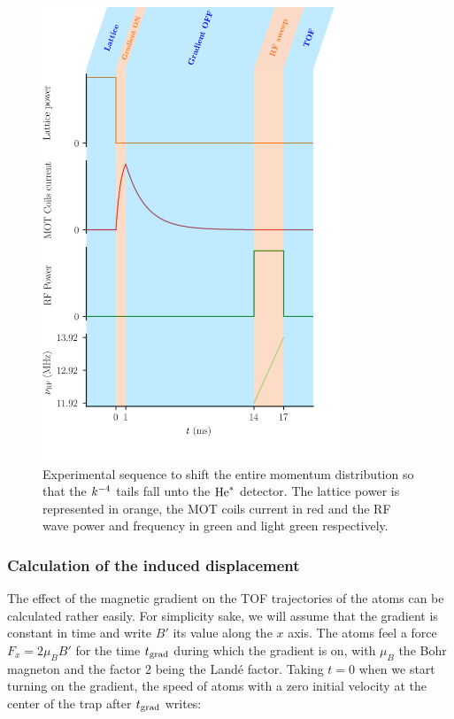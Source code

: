 \begin{figure}
    \centering
    \includegraphics[width=0.8\textwidth]{Fig/Chapter5/displacement_sequence.png}
    \caption[Experimental sequence to shift the entire momentum distribution so that the $\kmf$ tails fall unto the $\He$ detector]{Experimental sequence to shift the entire momentum distribution so that the $\kmf$ tails fall unto the $\He$ detector. The lattice power is represented in orange, the MOT coils current in red and the RF wave power and frequency in green and light green respectively.}
    \label{fig:displacement_sequence}
\end{figure}

\subsubsection{Calculation of the induced displacement}

The effect of the magnetic gradient on the TOF trajectories of the atoms can be calculated rather easily. For simplicity sake, we will assume that the gradient is constant in time and write $B'$ its value along the $x$ axis. The atoms feel a force $F_x=2 \mu_B B'$ for the time $t_{\rm{grad}}$ during which the gradient is on, with $\mu_B$ the Bohr magneton and the factor 2 being the Landé factor. Taking $t=0$ when we start turning on the gradient, the speed of atoms with a zero initial velocity at the center of the trap after $t_{\rm{grad}}$ writes:

